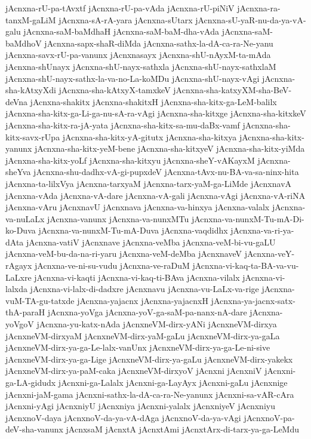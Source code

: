 {jAcnxna-rU-pa-tAvxtf
jAcnxna-rU-pa-vAda
jAcnxna-rU-piNiV
jAcnxna-ra-tanxM-gaLiM
jAcnxna-sA-rA-yara
jAcnxna-sUtarx
jAcnxna-sU-yaR-nu-da-ya-vA-galu
jAcnxna-saM-baMdhaH
jAcnxna-saM-baM-dha-vAda
jAcnxna-saM-baMdhoV
jAcnxna-sapx-shaR-diMda
jAcnxna-sathx-la-dA-ca-ra-Ne-yanu
jAcnxna-savx-rU-pa-vanunx
jAcnxnasayx
jAcnxna-shU-nAyxM-ta-mAda
jAcnxna-shUnayx
jAcnxna-shU-nayx-sathxla
jAcnxna-shU-nayx-sathxlaM
jAcnxna-shU-nayx-sathx-la-va-no-La-koMDu
jAcnxna-shU-nayx-vAgi
jAcnxna-sha-kAtxyXdi
jAcnxna-sha-kAtxyX-tamxkeV
jAcnxna-sha-katxyXM-sha-BeV-deVna
jAcnxna-shakitx
jAcnxna-shakitxH
jAcnxna-sha-kitx-ga-LeM-balilx
jAcnxna-sha-kitx-ga-Li-ga-nu-sA-ra-vAgi
jAcnxna-sha-kitxge
jAcnxna-sha-kitxkeV
jAcnxna-sha-kitx-ra-jA-yata
jAcnxna-sha-kitx-sa-mu-daBx-vamf
jAcnxna-sha-kitx-savx-rUpa
jAcnxna-sha-kitx-yA-gitutx
jAcnxna-sha-kitxya
jAcnxna-sha-kitx-yanunx
jAcnxna-sha-kitx-yeM-bene
jAcnxna-sha-kitxyeV
jAcnxna-sha-kitx-yiMda
jAcnxna-sha-kitx-yoLf
jAcnxna-sha-kitxyu
jAcnxna-sheY-vAKayxM
jAcnxna-sheYva
jAcnxna-shu-dadhx-vA-gi-pupxdeV
jAcnxna-tAvx-nu-BA-va-sa-ninx-hita
jAcnxna-ta-lilxVya
jAcnxna-tarxyaM
jAcnxna-tarx-yaM-ga-LiMde
jAcnxnavA
jAcnxna-vAda
jAcnxna-vA-dare
jAcnxna-vA-gali
jAcnxna-vAgi
jAcnxna-vA-riNA
jAcnxna-vAru
jAcnxnavU
jAcnxnava
jAcnxna-va-hinxya
jAcnxna-valalx
jAcnxna-va-nuLaLx
jAcnxna-vanunx
jAcnxna-va-nunxMTu
jAcnxna-va-nunxM-Tu-mA-Di-ko-Duva
jAcnxna-va-nunxM-Tu-mA-Duva
jAcnxna-vaqdidhx
jAcnxna-va-ri-ya-dAta
jAcnxna-vatiV
jAcnxnave
jAcnxna-veMba
jAcnxna-veM-bi-vu-gaLU
jAcnxna-veM-bu-da-na-ri-yaru
jAcnxna-veM-deMba
jAcnxnaveV
jAcnxna-veY-rAgayx
jAcnxna-ve-ni-su-vudu
jAcnxna-ve-raDuM
jAcnxna-vi-kaq-ta-BA-va-vu-LaLxre
jAcnxna-vi-kaqti
jAcnxna-vi-kaq-ti-BAva
jAcnxna-vilalx
jAcnxna-vi-lalxda
jAcnxna-vi-lalx-di-dadxre
jAcnxnavu
jAcnxna-vu-LaLx-va-rige
jAcnxna-vuM-TA-gu-tatxde
jAcnxna-yajacnx
jAcnxna-yajacnxH
jAcnxna-ya-jacnx-satx-thA-paraH
jAcnxna-yoVga
jAcnxna-yoV-ga-saM-pa-nanx-nA-dare
jAcnxna-yoVgoV
jAcnxna-yu-katx-nAda
jAcnxneVM-dirx-yANi
jAcnxneVM-dirxya
jAcnxneVM-dirxyaM
jAcnxneVM-dirx-yaM-gaLu
jAcnxneVM-dirx-ya-gaLa
jAcnxneVM-dirx-ya-ga-Le-lalx-vanUnx
jAcnxneVM-dirx-ya-ga-Le-ni-sive
jAcnxneVM-dirx-ya-ga-Lige
jAcnxneVM-dirx-ya-gaLu
jAcnxneVM-dirx-yakekx
jAcnxneVM-dirx-ya-paM-caka
jAcnxneVM-dirxyoV
jAcnxni
jAcnxniV
jAcnxni-ga-LA-gidudx
jAcnxni-ga-Lalalx
jAcnxni-ga-LayAyx
jAcnxni-gaLu
jAcnxnige
jAcnxni-jaM-gama
jAcnxni-sathx-la-dA-ca-ra-Ne-yanunx
jAcnxni-sa-vAR-cAra
jAcnxni-yAgi
jAcnxniyU
jAcnxniya
jAcnxni-yalalx
jAcnxniyeV
jAcnxniyu
jAcnxnoV-daya
jAcnxnoV-da-ya-vA-dAga
jAcnxnoV-da-ya-vAgi
jAcnxnoV-pa-deV-sha-vanunx
jAcnxsaM
jAcnxtA
jAcnxtAmi
jAcnxtArx-di-tarx-ya-ga-LeMdu
}
